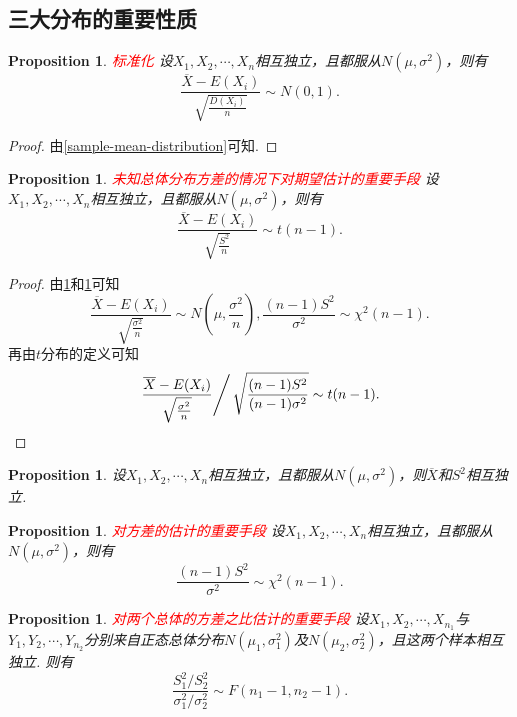 \documentclass{article}
\newtheorem{proposition}[theorem]{Proposition}
\newcommand{\redt}[1]{\textcolor{red}{#1}}
\begin{document}
\subsection{三大分布的重要性质}

\begin{proposition}\label{sample-means-normalization}
\rm \redt{标准化} 设$X_1,X_2,\cdots,X_n$相互独立，且都服从$N(\mu,\sigma^2)$，则有
$$
\frac{\overline{X} - E(X_i)}{\sqrt{\frac{D(X_i)}{n}}} \sim N(0,1).
$$
\end{proposition}

\begin{proof}
\rm 由\ref{sample-mean-distribution}可知.
\end{proof}

\begin{proposition}\label{sample-variance-replace-variance}
\rm \redt{未知总体分布方差的情况下对期望估计的重要手段} 设$X_1,X_2,\cdots,X_n$相互独立，且都服从$N(\mu,\sigma^2)$，则有
$$
\frac{\overline{X} - E(X_i)}{\sqrt{\frac{S^2}{n}}} \sim t(n-1). 
$$
\end{proposition}

\begin{proof}
由\ref{sample-means-normalization}和\ref{sample-variance-and-variance}可知
$$
\frac{\overline{X}-E(X_i)}{\sqrt{\frac{\sigma^2}{n}}} \sim N(\mu,\frac{\sigma^2}{n}),\frac{(n-1)S^2}{\sigma^2} \sim \chi^2(n-1).
$$
再由$t$分布的定义可知
$$
\left. \frac{\overline{X}-E(X_i)}{\sqrt{\frac{\sigma^2}{n}}} \right/ \sqrt{\frac{(n-1)S^2}{(n-1)\sigma^2}} \sim t(n-1).
$$
\end{proof}

\begin{proposition}
\rm 设$X_1,X_2,\cdots,X_n$相互独立，且都服从$N(\mu,\sigma^2)$，则$\overline{X}$和$S^2$相互独立. 
\end{proposition}

\begin{proposition}\label{sample-variance-and-variance}
\rm \redt{对方差的估计的重要手段} 设$X_1,X_2,\cdots,X_n$相互独立，且都服从$N(\mu,\sigma^2)$，则有
$$
\frac{(n-1)S^2}{\sigma^2} \sim \chi^2(n-1). 
$$
\end{proposition}

\begin{proposition}
\rm \redt{对两个总体的方差之比估计的重要手段} 设$X_1,X_2,\cdots,X_{n_1}$与$Y_1,Y_2,\cdots,Y_{n_2}$分别来自正态总体分布$N(\mu_1,\sigma_1^2)$及$N(\mu_2,\sigma_2^2)$，且这两个样本相互独立. 则有
$$
\frac{S_1^2/S_2^2}{\sigma_1^2 / \sigma_2^2} \sim F(n_1 -1,n_2 -1). 
$$
\end{proposition}
\end{document}
